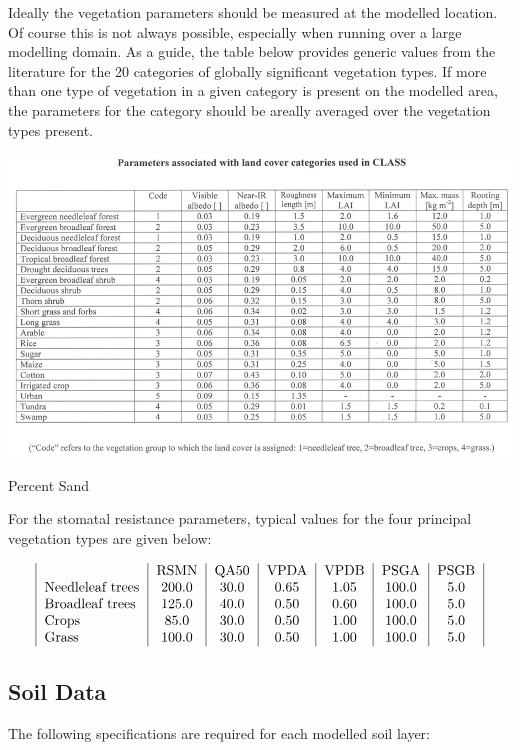 Ideally the vegetation parameters should be measured at the modelled location. Of course this is not always possible, especially when running over a large modelling domain. As a guide, the table below provides generic values from the literature for the 20 categories of globally significant vegetation types. If more than one type of vegetation in a given category is present on the modelled area, the parameters for the category should be areally averaged over the vegetation types present.


\begin{DoxyImage}
\includegraphics[width=\textwidth,height=\textheight/2,keepaspectratio=true]{landcovercat_table.png}
\caption{Percent Sand}
\end{DoxyImage}
 For the stomatal resistance parameters, typical values for the four principal vegetation types are given below\+:

\[ \begin{tabular}{ | l | c | c | c | c | c | c | } & RSMN & QA50 & VPDA & VPDB & PSGA & PSGB \\ Needleleaf trees & 200.0 & 30.0 & 0.65 & 1.05 & 100.0 & 5.0 \\ Broadleaf trees & 125.0 & 40.0 & 0.50 & 0.60 & 100.0 & 5.0 \\ Crops & 85.0 & 30.0 & 0.50 & 1.00 & 100.0 & 5.0 \\ Grass & 100.0 & 30.0 & 0.50 & 1.00 & 100.0 & 5.0 \\ \end{tabular} \]\hypertarget{index_soilData}{}\subsection{Soil Data}\label{index_soilData}
The following specifications are required for each modelled soil layer\+:


